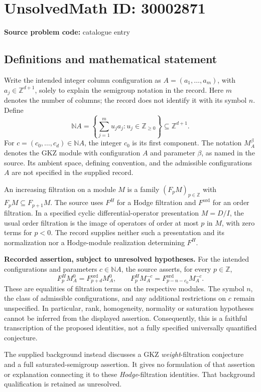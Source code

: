 \documentclass[11pt]{article}
\newcommand{\N}{\mathbb{N}}
\newcommand{\Z}{\mathbb{Z}}
\begin{document}
\section*{UnsolvedMath ID: 30002871}
\textbf{Source problem code:} catalogue entry
\subsection{Definitions and mathematical statement}
Write the intended integer column configuration as \(A=(a_1,\ldots,a_m)\), with \(a_j\in\Z^{d+1}\), solely to explain the semigroup notation in the record. Here \(m\) denotes the number of columns; the record does not identify it with its symbol \(n\). Define
\[
\N A=\left\{\sum_{j=1}^{m}u_j a_j : u_j\in\Z_{\geq 0}\right\}\subseteq\Z^{d+1}.
\]
For \(c=(c_0,\ldots,c_d)\in\N A\), the integer \(c_0\) is its first component. The notation \(M_A^\beta\) denotes the GKZ module with configuration \(A\) and parameter \(\beta\), as named in the source. Its ambient space, defining convention, and the admissible configurations \(A\) are not specified in the supplied record.

An increasing filtration on a module \(M\) is a family \((F_pM)_{p\in\Z}\) with \(F_pM\subseteq F_{p+1}M\). The source uses \(F^H\) for a Hodge filtration and \(F^{\mathrm{ord}}\) for an order filtration. In a specified cyclic differential-operator presentation \(M=D/I\), the usual order filtration is the image of operators of order at most \(p\) in \(M\), with zero terms for \(p<0\). The record supplies neither such a presentation and its normalization nor a Hodge-module realization determining \(F^H\).

\textbf{Recorded assertion, subject to unresolved hypotheses.} For the intended configurations and parameters \(c\in\N A\), the source asserts, for every \(p\in\Z\),
\[
F^H_p M_A^0=F^{\mathrm{ord}}_{p+d}M_A^0,
\qquad
F^H_p M_A^{-c}=F^{\mathrm{ord}}_{p-n-c_0}M_A^{-c}.
\]
These are equalities of filtration terms on the respective modules. The symbol \(n\), the class of admissible configurations, and any additional restrictions on \(c\) remain unspecified. In particular, rank, homogeneity, normality or saturation hypotheses cannot be inferred from the displayed assertion. Consequently, this is a faithful transcription of the proposed identities, not a fully specified universally quantified conjecture.

The supplied background instead discusses a GKZ \emph{weight}-filtration conjecture and a full saturated-semigroup assertion. It gives no formulation of that assertion or explanation connecting it to these \emph{Hodge}-filtration identities. That background qualification is retained as unresolved.
\end{document}
